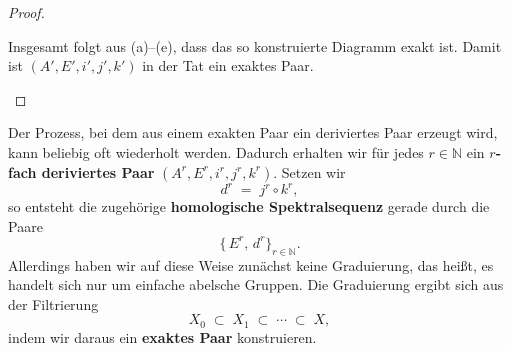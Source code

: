 \documentclass[12pt]{article}
\numberwithin{conj}{section}
\begin{document}
\begin{proof}
\begin{enumerate}[nolistsep]
                Insgesamt folgt aus (a)--(e), dass das so konstruierte Diagramm exakt
                ist. Damit ist $(A', E', i', j', k')$ in der Tat ein exaktes Paar.
        \end{enumerate}
    \end{proof}

    Der Prozess, bei dem aus einem exakten Paar ein deriviertes Paar erzeugt wird,
    kann beliebig oft wiederholt werden. Dadurch erhalten wir für jedes
    $r \in \mathbb{N}$ ein \textbf{$r$-fach deriviertes Paar} $(A^{r}, E^{r}, i^{r}
    , j^{r}, k^{r})$. Setzen wir
    \[
        d^{r} \;=\; j^{r} \circ k^{r},
    \]
    so entsteht die zugehörige \textbf{homologische Spektralsequenz} gerade durch die
    Paare
    \[
        \{\,E^{r},\, d^{r}\}_{r \in \mathbb{N}}.
    \]
    Allerdings haben wir auf diese Weise zunächst keine Graduierung, das heißt, es
    handelt sich nur um einfache abelsche Gruppen. Die Graduierung ergibt sich aus
    der Filtrierung
    \[
        X_{0} \;\subset\; X_{1} \;\subset\; \cdots \;\subset\; X,
    \]
    indem wir daraus ein \textbf{exaktes Paar} konstruieren.
\end{document}
